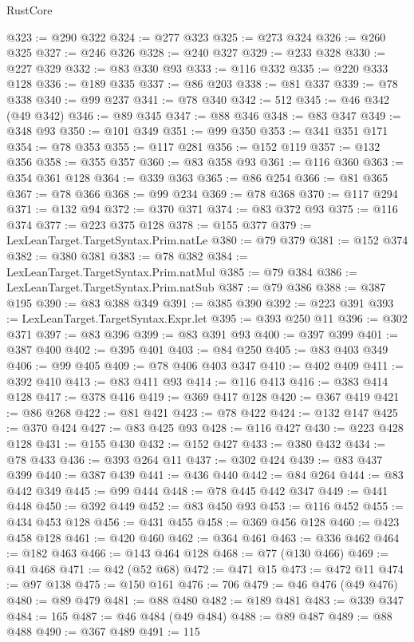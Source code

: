 \begin{lexlean}{RustCore}
\begin{coremodule}
@323 := @290 @322
@324 := @277 @323
@325 := @273 @324
@326 := @260 @325
@327 := @246 @326
@328 := @240 @327
@329 := @233 @328
@330 := @227 @329
@332 := @83 @330 @93
@333 := @116 @332
@335 := @220 @333 @128
@336 := @189 @335
@337 := @86 @203
@338 := @81 @337
@339 := @78 @338
@340 := @99 @237
@341 := @78 @340
@342 := 512
@345 := @46 @342 (@49 @342)
@346 := @89 @345
@347 := @88 @346
@348 := @83 @347
@349 := @348 @93
@350 := @101 @349
@351 := @99 @350
@353 := @341 @351 @171
@354 := @78 @353
@355 := @117 @281
@356 := @152 @119
@357 := @132 @356
@358 := @355 @357
@360 := @83 @358 @93
@361 := @116 @360
@363 := @354 @361 @128
@364 := @339 @363
@365 := @86 @254
@366 := @81 @365
@367 := @78 @366
@368 := @99 @234
@369 := @78 @368
@370 := @117 @294
@371 := @132 @94
@372 := @370 @371
@374 := @83 @372 @93
@375 := @116 @374
@377 := @223 @375 @128
@378 := @155 @377
@379 := LexLeanTarget.TargetSyntax.Prim.natLe
@380 := @79 @379
@381 := @152 @374
@382 := @380 @381
@383 := @78 @382
@384 := LexLeanTarget.TargetSyntax.Prim.natMul
@385 := @79 @384
@386 := LexLeanTarget.TargetSyntax.Prim.natSub
@387 := @79 @386
@388 := @387 @195
@390 := @83 @388 @349
@391 := @385 @390
@392 := @223 @391
@393 := LexLeanTarget.TargetSyntax.Expr.let
@395 := @393 @250 @11
@396 := @302 @371
@397 := @83 @396
@399 := @83 @391 @93
@400 := @397 @399
@401 := @387 @400
@402 := @395 @401
@403 := @84 @250
@405 := @83 @403 @349
@406 := @99 @405
@409 := @78 @406 @403 @347
@410 := @402 @409
@411 := @392 @410
@413 := @83 @411 @93
@414 := @116 @413
@416 := @383 @414 @128
@417 := @378 @416
@419 := @369 @417 @128
@420 := @367 @419
@421 := @86 @268
@422 := @81 @421
@423 := @78 @422
@424 := @132 @147
@425 := @370 @424
@427 := @83 @425 @93
@428 := @116 @427
@430 := @223 @428 @128
@431 := @155 @430
@432 := @152 @427
@433 := @380 @432
@434 := @78 @433
@436 := @393 @264 @11
@437 := @302 @424
@439 := @83 @437 @399
@440 := @387 @439
@441 := @436 @440
@442 := @84 @264
@444 := @83 @442 @349
@445 := @99 @444
@448 := @78 @445 @442 @347
@449 := @441 @448
@450 := @392 @449
@452 := @83 @450 @93
@453 := @116 @452
@455 := @434 @453 @128
@456 := @431 @455
@458 := @369 @456 @128
@460 := @423 @458 @128
@461 := @420 @460
@462 := @364 @461
@463 := @336 @462
@464 := @182 @463
@466 := @143 @464 @128
@468 := @77 (@130 @466)
@469 := @41 @468
@471 := @42 (@52 @68)
@472 := @471 @15
@473 := @472 @11
@474 := @97 @138
@475 := @150 @161
@476 := 706
@479 := @46 @476 (@49 @476)
@480 := @89 @479
@481 := @88 @480
@482 := @189 @481
@483 := @339 @347
@484 := 165
@487 := @46 @484 (@49 @484)
@488 := @89 @487
@489 := @88 @488
@490 := @367 @489
@491 := 115

\end{coremodule}
\end{lexlean}
